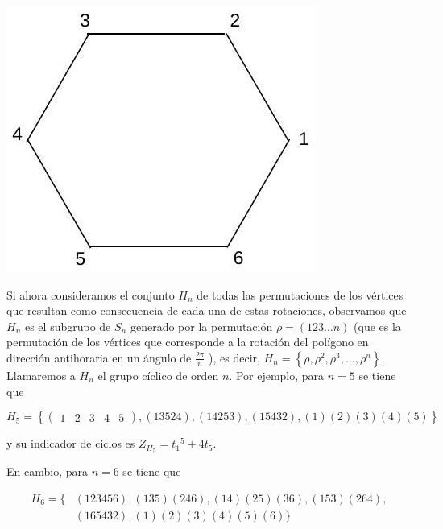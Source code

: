 \documentclass[10pt]{article}
\begin{document}
\includegraphics[max width=\textwidth, center]{2025_09_05_3ba26226ec0baddb5a03g-45}

Si ahora consideramos el conjunto $H_{n}$ de todas las permutaciones de los vértices que resultan como consecuencia de cada una de estas rotaciones, observamos que $H_{n}$ es el subgrupo de $S_{n}$ generado por la permutación $\rho=(123 \ldots n)$ (que es la permutación de los vértices que corresponde a la rotación del polígono en dirección antihoraria en un ángulo de $\frac{2 \pi}{n}$ ), es decir, $H_{n}=\left\{\rho, \rho^{2}, \rho^{3}, \ldots, \rho^{n}\right\}$. Llamaremos a $H_{n}$ el grupo cíclico de orden $n$. Por ejemplo, para $n=5$ se tiene que

$$
H_{5}=\left\{\left(\begin{array}{lllll}
1 & 2 & 3 & 4 & 5
\end{array}\right),(13524),(14253),(15432),(1)(2)(3)(4)(5)\right\}
$$

y su indicador de ciclos es $Z_{H_{5}}=t_{1}{ }^{5}+4 t_{5}$.

En cambio, para $n=6$ se tiene que

$$
\begin{aligned}
H_{6}=\{ & (123456),(135)(246),(14)(25)(36),(153)(264), \\
& (165432),(1)(2)(3)(4)(5)(6)\}
\end{aligned}
$$
\end{document}
